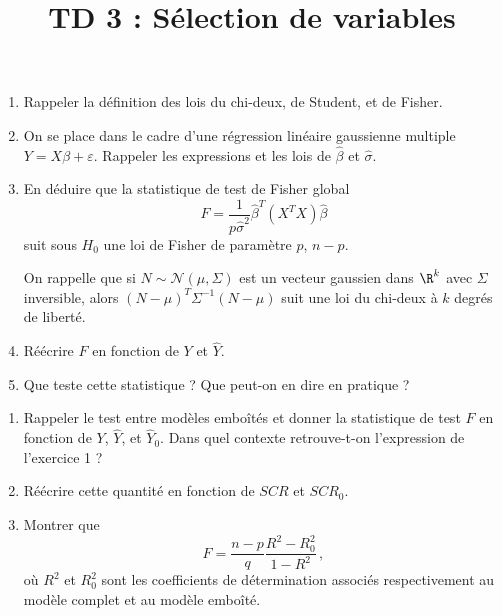 \documentclass{../td_um}
\title{TD 3 : Sélection de variables}
\providecommand{\1}{\mathds{1}}
\begin{document}
	\maketitle
	
	\begin{enumerate}
		\item Rappeler la définition des lois du chi-deux, de Student, et de Fisher.
		\item On se place dans le cadre d'une régression linéaire gaussienne multiple $Y = X \beta + \varepsilon$. Rappeler les expressions et les lois de $\hat \beta$ et $\hat \sigma$.
		\item En déduire que la statistique de test de Fisher global
		\[
		F = \dfrac{1}{p \hat \sigma^2} \hat \beta^T (X^TX) \hat \beta
		\]
		suit sous $H_0$ une loi de Fisher de paramètre $p$, $n-p$.
		
		On rappelle que si $N \sim \mathcal{N}(\mu, \Sigma)$ est un vecteur gaussien dans $\R^k$ avec $\Sigma$ inversible, alors $(N-\mu)^T \Sigma^{-1} (N-\mu)$ suit une loi du chi-deux à $k$ degrés de liberté.
		\item Réécrire $F$ en fonction de $Y$ et $\hat Y$.
		\item Que teste cette statistique ? Que peut-on en dire en pratique ?
	\end{enumerate}


	
	\begin{enumerate}
		\item Rappeler le test entre modèles emboîtés et donner la statistique de test $F$ en fonction de $Y$, $\hat Y$, et $\hat Y_0$. Dans quel contexte retrouve-t-on l'expression de l'exercice 1 ?
		\item Réécrire cette quantité en fonction de $SCR$ et $SCR_0$.
		\item Montrer que
		\[
		F = \dfrac{n-p}{q} \dfrac{R^2 - R_0^2}{1-R^2}\,,
		\]
		où $R^2$ et $R_0^2$ sont les coefficients de détermination associés respectivement au modèle complet et au modèle emboîté.
	\end{enumerate}

	
\end{document}
